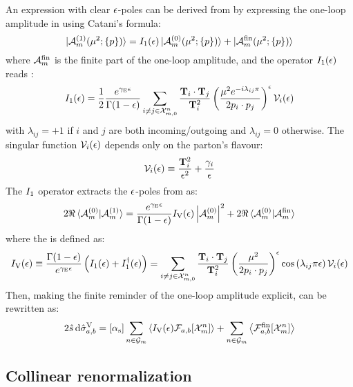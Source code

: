An expression with clear $ \epsilon $-poles can be derived from  by expressing the one-loop amplitude in  using Catani's formula:
\begin{equation}
  \ket{\mathcal{A}_m^{(1)}(\mu^2 ; \{p\})} = I_1(\epsilon) \ket{\mathcal{A}_m^{(0)}(\mu^2 ; \{p\})} + \ket{\mathcal{A}_m^\text{fin}(\mu^2 ; \{p\})}
\end{equation}
where $ \mathcal{A}_m^\text{fin} $ is the finite part of the one-loop amplitude, and the operator $ I_1(\epsilon) $ reads \cite{Catani-1998}:
\begin{equation}
  I_1(\epsilon) = \frac{1}{2} \frac{e^{\gamma_\text{E}\epsilon}}{\Gamma(1-\epsilon)} \sum_{i \neq j \in \mathcal{X}^{n}_{m,0}} \frac{\mathbf{T}_i \cdot \mathbf{T}_j}{\mathbf{T}_i^2} \left( \frac{\mu^2 e^{-i \lambda_{ij} \pi}}{2p_i \cdot p_j} \right)^\epsilon \mathcal{V}_i(\epsilon)
  \label{eq:ioo}
\end{equation}
with $ \lambda_{ij} = +1 $ if $ i $ and $ j $ are both incoming/outgoing and $ \lambda_{ij} = 0 $ otherwise. The singular function $ \mathcal{V}_i(\epsilon) $ depends only on the parton's flavour:
\begin{equation}
  \mathcal{V}_i(\epsilon) \equiv \frac{\mathbf{T}_i^2}{\epsilon^2} + \frac{\gamma_i}{\epsilon}
\end{equation}
The $ I_1 $ operator extracts the $ \epsilon $-poles from  as:
\begin{equation*}
  2\Re \braket{\mathcal{A}_m^{(0)} | \mathcal{A}_m^{(1)}} = \frac{e^{\gamma_\text{E}\epsilon}}{\Gamma(1-\epsilon)} I_\text{V}(\epsilon) \left\lvert\mathcal{A}_m^{(0)}\right\rvert^2 + 2\Re \braket{\mathcal{A}_m^{(0)} | \mathcal{A}_m^\text{fin}}
\end{equation*}
where the  is defined as:
\begin{equation}
  I_\text{V}(\epsilon) \equiv \frac{\Gamma(1-\epsilon)}{e^{\gamma_\text{E}\epsilon}} \left( I_1(\epsilon) + I_1^\dagger(\epsilon) \right) = \sum_{i \neq j \in \mathcal{X}^{n}_{m,0}} \frac{\mathbf{T}_i \cdot \mathbf{T}_j}{\mathbf{T}_i^2} \left( \frac{\mu^2}{2p_i \cdot p_j} \right)^\epsilon \cos \left( \lambda_{ij} \pi \epsilon \right) \mathcal{V}_i(\epsilon)
\end{equation}
Then, making the finite reminder of the one-loop amplitude explicit,  can be rewritten as:
\begin{equation}
  2\hat{s}\, \mathrm{d}\hat{\sigma}_{a,b}^\text{V} = [\alpha_\text{s}] \sum_{n \in \mathcal{G}_m} \left\langle I_\text{V}(\epsilon) \mathcal{F}_{a,b}[\mathcal{X}^{n}_{m}] \right\rangle + \sum_{n \in \mathcal{G}_m} \left\langle \mathcal{F}_{a,b}^\text{fin}[\mathcal{X}^{n}_{m}] \right\rangle
\end{equation}

\subsection{Collinear renormalization}
\label{ssec:coll-ren}

